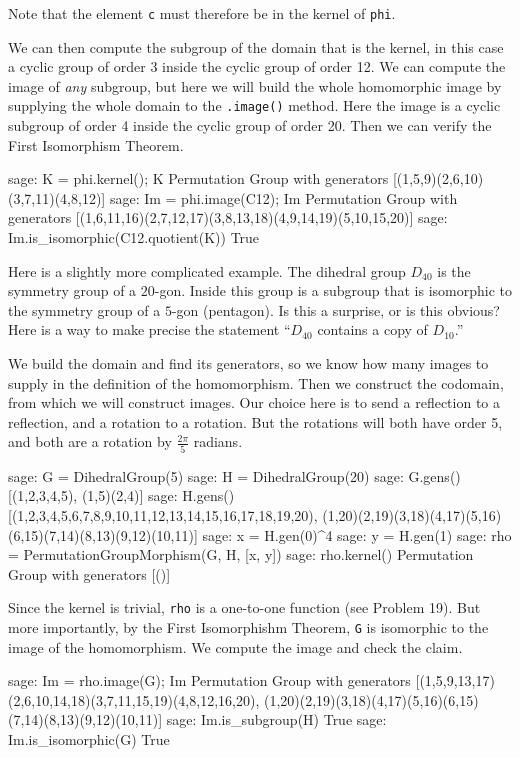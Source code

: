%
Note that the element \verb?c? must therefore be in the kernel of \verb?phi?.\par
%
We can then compute the subgroup of the domain that is the kernel, in this case a cyclic group of order 3 inside the cyclic group of order 12.  We can compute the image of \emph{any} subgroup, but here we will build the whole homomorphic image by supplying the whole domain to the \verb?.image()? method.  Here the image is a cyclic subgroup of order 4 inside the cyclic group of order 20.  Then we can verify the First Isomorphism Theorem.
%
\begin{sageexample}
sage: K = phi.kernel(); K
Permutation Group with generators [(1,5,9)(2,6,10)(3,7,11)(4,8,12)]
sage: Im = phi.image(C12); Im
Permutation Group with generators
[(1,6,11,16)(2,7,12,17)(3,8,13,18)(4,9,14,19)(5,10,15,20)]
sage: Im.is_isomorphic(C12.quotient(K))
True
\end{sageexample}
%
Here is a slightly more complicated example.  The dihedral group $D_{40}$ is the symmetry group of a $20$-gon.  Inside this group is a subgroup that is isomorphic to the symmetry group of a $5$-gon (pentagon).  Is this a surprise, or is this obvious?  Here is a way to make precise the statement ``$D_{40}$ contains a copy of $D_{10}$.''\par
%
We build the domain and find its generators, so we know how many images to supply in the definition of the homomorphism.  Then we construct the codomain, from which we will construct images.  Our choice here is to send a reflection to a reflection, and a rotation to a rotation.  But the rotations will both have order 5, and both are a rotation by $\frac{2\pi}{5}$ radians.
%
\begin{sageexample}
sage: G = DihedralGroup(5)
sage: H = DihedralGroup(20)
sage: G.gens()
[(1,2,3,4,5), (1,5)(2,4)]
sage: H.gens()
[(1,2,3,4,5,6,7,8,9,10,11,12,13,14,15,16,17,18,19,20),
 (1,20)(2,19)(3,18)(4,17)(5,16)(6,15)(7,14)(8,13)(9,12)(10,11)]
sage: x = H.gen(0)^4
sage: y = H.gen(1)
sage: rho = PermutationGroupMorphism(G, H, [x, y])
sage: rho.kernel()
Permutation Group with generators [()]
\end{sageexample}
%
Since the kernel is trivial, \verb?rho? is a one-to-one function (see Problem 19).  But more importantly, by the First Isomorphishm Theorem, \verb?G? is isomorphic to the image of the homomorphism.  We compute the image and check the claim.
%
\begin{sageexample}
sage: Im = rho.image(G); Im
Permutation Group with generators
[(1,5,9,13,17)(2,6,10,14,18)(3,7,11,15,19)(4,8,12,16,20),
 (1,20)(2,19)(3,18)(4,17)(5,16)(6,15)(7,14)(8,13)(9,12)(10,11)]
sage: Im.is_subgroup(H)
True
sage: Im.is_isomorphic(G)
True
\end{sageexample}
